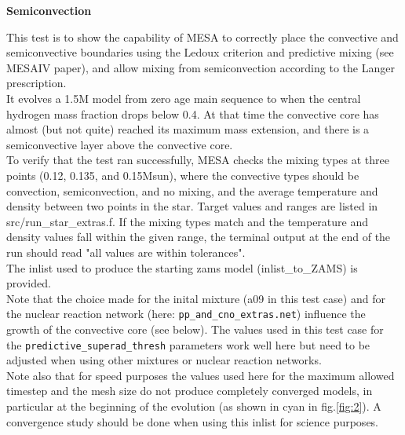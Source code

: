 \documentclass{article}
\begin{document}
	
	\begin{center}
	  \begin{Large}
	    \textbf{Semiconvection}\\
	  \end{Large}
	\end{center}


This test is to show the capability of MESA to correctly place the convective and semiconvective boundaries using the Ledoux criterion and predictive mixing (see MESAIV paper), and allow mixing from semiconvection according to the Langer prescription.\\

It evolves a 1.5M model from zero age main sequence to when the central hydrogen mass fraction drops below 0.4. At that time the convective core has almost (but not quite) reached its maximum mass extension, and there is a semiconvective layer above the convective core.\\

To verify that the test ran successfully, MESA checks the mixing types at three points (0.12, 0.135, and 0.15Msun), where the convective types should be convection, semiconvection, and no mixing, and the average temperature and density between two points in the star. Target values and ranges are listed in src/run\_star\_extras.f. If the mixing types match and the temperature and density values fall within the given range, the terminal output at the end of the run should read "all values are within tolerances".\\

The inlist used to produce the starting zams model (inlist\_to\_ZAMS) is provided.\\

Note that the choice made for the inital mixture (a09 in this test case) and for the nuclear reaction network (here: \texttt{pp\_and\_cno\_extras.net}) influence the growth of the convective core (see below). The values used in this test case for the \texttt{predictive\_superad\_thresh} parameters work well here but need to be adjusted when using other mixtures or nuclear reaction networks.\\

Note also that for speed purposes the values used here for the maximum allowed timestep and the mesh size do not produce completely converged models, in particular at the beginning of the evolution (as shown in cyan in fig.\ref{fig:2}). A convergence study should be done when using this inlist for science purposes.\\
\end{document}

